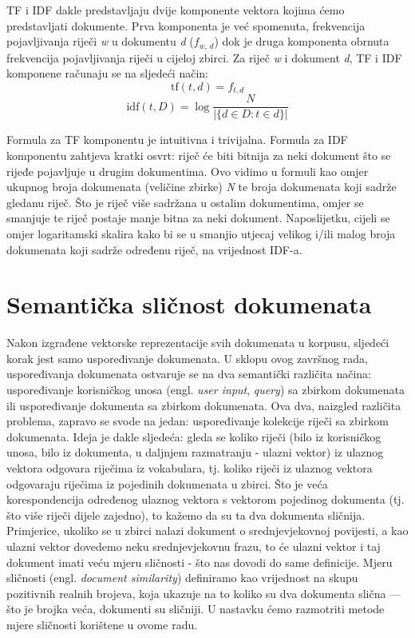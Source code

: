 \documentclass[times, utf8, zavrsni]{fer}
\begin{document}
TF i IDF dakle predstavljaju dvije komponente vektora kojima ćemo predstavljati dokumente. Prva komponenta je već spomenuta, frekvencija pojavljivanja riječi \textit{w} u dokumentu \textit{d} ($f_\textit{w, d}$) dok je druga komponenta obrnuta frekvencija pojavljivanja riječi u cijeloj zbirci.
Za riječ \textit{w} i dokument \textit{d}, TF i IDF komponene računaju se na sljedeći način:
\begin{equation}
{\displaystyle \mathrm {tf} (t,d)=f_{t,d}}
\end{equation}
\begin{equation}
{\displaystyle \mathrm {idf} (t,D)=\log {\frac {N}{|\{d\in D:t\in d\}|}}}
\end{equation}

Formula za TF komponentu je intuitivna i trivijalna. Formula za IDF komponentu zahtjeva kratki osvrt: riječ će biti bitnija za neki dokument što se rijeđe pojavljuje u drugim dokumentima. Ovo vidimo u formuli kao omjer ukupnog broja dokumenata (veličine zbirke) \textit{N} te broja dokumenata koji sadrže gledanu riječ. Što je riječ više sadržana u ostalim dokumentima, omjer se smanjuje te riječ postaje manje bitna za neki dokument. Naposlijetku, cijeli se omjer logaritamski skalira kako bi se u smanjio utjecaj velikog i/ili malog broja dokumenata koji sadrže određenu riječ, na vrijednost IDF-a.

\section{Semantička sličnost dokumenata}
Nakon izgrađene vektorske reprezentacije svih dokumenata u korpusu, sljedeći korak jest samo uspoređivanje dokumenata. U sklopu ovog završnog rada, uspoređivanja dokumenata ostvaruje se na dva semantički različita načina: uspoređivanje korisničkog unosa (engl. \textit{user input}, \textit{query}) sa zbirkom dokumenata ili uspoređivanje dokumenta sa zbirkom dokumenata.
Ova dva, naizgled različita problema, zapravo se svode na jedan: uspoređivanje kolekcije riječi sa zbirkom dokumenata. Ideja je dakle sljedeća: gleda se koliko riječi (bilo iz korisničkog unosa, bilo iz dokumenta, u daljnjem razmatranju - ulazni vektor) iz ulaznog vektora odgovara riječima iz vokabulara, tj. koliko riječi iz ulaznog vektora odgovaraju riječima iz pojedinih dokumenata u zbirci. Što je veća korespondencija određenog ulaznog vektora s vektorom pojedinog dokumenta (tj. što više riječi dijele zajedno), to kažemo da su ta dva dokumenta sličnija. Primjerice, ukoliko se u zbirci nalazi dokument o srednjevjekovnoj povijesti, a kao ulazni vektor dovedemo neku srednjevjekovnu frazu, to će ulazni vektor i taj dokument imati veću mjeru sličnosti - što nas dovodi do same definicije.
Mjeru sličnosti (engl. \textit{document similarity}) definiramo kao vrijednost na skupu pozitivnih realnih brojeva, koja ukazuje na to koliko su dva dokumenta slična — što je brojka veća, dokumenti su sličniji.
U nastavku ćemo razmotriti metode mjere sličnosti korištene u ovome radu.
\end{document}
